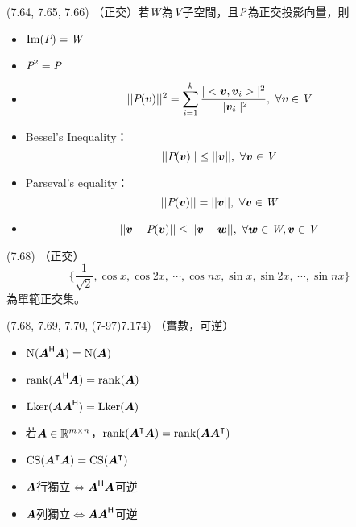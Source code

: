 \item \begin{theorem}{(7.64, 7.65, 7.66)} （正交）若$\spc{W}$為$\V$子空間，且$\P$為正交投影向量，則
	\begin{itemize}
		\item $\im(\P) = \spc{W}$
		\item $\P^2 = \P$
		\item 
		\begin{equation}
			||\P(\vec{v})||^2 = \sum_{i = 1}^{k}\frac{|\dotp{\vec{v}}{\vec{v}_i}|^2}{||\vec{v_i}||^2}, \ \forall \vec{v} \in \V
		\end{equation}
		\item Bessel's Inequality：
		\begin{equation}
			||\P(\vec{v})|| \le ||\vec{v}||, \ \forall \vec{v} \in \V
		\end{equation}
		\item Parseval's equality：
		\begin{equation}
			||\P(\vec{v})|| = ||\vec{v}||, \ \forall \vec{v} \in \spc{W}
		\end{equation}
		\item 
		\begin{equation}
			||\vec{v} - \P(\vec{v})|| \le  ||\vec{v} - \vec{w}||, \ \forall \vec{w} \in \spc{W}, \vec{v} \in \V
		\end{equation}
	\end{itemize}
\end{theorem}

\item \begin{theorem}{(7.68)} （正交）
	\begin{equation}
		\{\frac{1}{\sqrt{2}}, \cos x, \cos 2x, \ \cdots, \cos nx, \sin x, \sin 2x, \ \cdots, \sin nx\}
	\end{equation}
	為單範正交集。
\end{theorem}

\item \begin{theorem}{(7.68, 7.69, 7.70, (7-97)7.174)} （實數，可逆）
	\begin{itemize}
		\item $\Ker(\mat{A}\herm \mat{A}) = \Ker(\mat{A})$
		\item $\rnk(\mat{A}\herm \mat{A}) = \rnk(\mat{A})$
		\item $\lker(\mat{A} \mat{A}\herm) = \lker(\mat{A})$
		\item 若$\mat{A} \in \R^{m \times n}$，$\rnk(\mat{A}^\intercal \mat{A}) = \rnk(\mat{A}\mat{A}^\intercal)$
		\item $\cs(\mat{A}^\intercal\mat{A}) = \cs(\mat{A}^\intercal)$
		\item $\mat{A}$行獨立$\iff$$\mat{A}\herm\mat{A}$可逆
		\item $\mat{A}$列獨立$\iff$$\mat{A}\mat{A}\herm$可逆
	\end{itemize}
\end{theorem}


